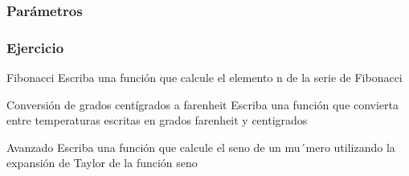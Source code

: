 \documentclass[10pt,colorlinks]{beamer}
\begin{document}
\begin{frame}[fragile]\frametitle{Parámetros}



\end{frame}

\begin{frame}[fragile]\frametitle{Ejercicio}
\begin{block}{Fibonacci}
Escriba una función que calcule el elemento n de la serie de Fibonacci

\end{block}
\begin{block}{Conversión de grados centígrados a farenheit}
Escriba una función que convierta entre temperaturas escritas en grados farenheit y centigrados
\end{block}
\begin{block}{Avanzado}
Escriba una función que calcule el seno de un mu´mero utilizando la expansión de Taylor de la función seno

\end{block}


\end{frame}
\end{document}
